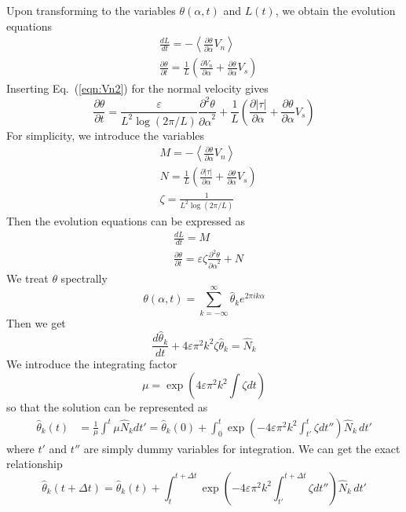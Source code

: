 \documentclass[11pt]{article}
\newcommand{\ppd}[2]  { \frac{\partial^2 #1}{{\partial #2}^2} }
\newcommand{\abs}[1]{\left| #1 \right|}
\newcommand{\mean}[1]{\left< #1 \right>}
\newcommand{\eps}{\varepsilon}
\newcommand{\atau}{\abs{\tau}}
\newcommand{\pderiv}[2]{\frac{\partial #1}{\partial #2}}
\newcommand{\tderiv}[2]{\frac{d #1}{d #2}}
\newcommand{\Vn}{V_n}
\newcommand{\Vs}{V_s}
\newcommand{\thalpha}{\pderiv{\theta}{\alpha}}
\newcommand{\elfun}{\zeta}
\newcommand{\thhat}{\hat{\theta}}
\begin{document}
Upon transforming to the variables $\theta(\alpha,t)$ and $L(t)$, we obtain the evolution equations
\begin{align}
& \tderiv{L}{t} = - \mean{\thalpha \Vn} \\
& \pderiv{\theta}{t} = \frac{1}{L} \left( \pderiv{\Vn}{\alpha} + \thalpha \Vs \right)
\end{align}
Inserting Eq.~(\ref{eqn:Vn2}) for the normal velocity gives
\begin{equation}
\pderiv{\theta}{t} = \frac{\eps}{L^{2} \log \left(2\pi/L \right)} \ppd{\theta}{\alpha} 
+ \frac{1}{L} \left( \pderiv{\atau}{\alpha} + \thalpha \Vs \right)
\end{equation}
For simplicity, we introduce the variables
\begin{align}
& M = - \mean{\thalpha \Vn} \\
& N = \frac{1}{L} \left( \pderiv{\atau}{\alpha} + \thalpha \Vs \right) \\
& \elfun = \frac{1}{L^{2} \log \left(2\pi/L \right)}
\end{align}
Then the evolution equations can be expressed as
\begin{align}
& \tderiv{L}{t} = M \\
& \pderiv{\theta}{t} = \eps \elfun \ppd{\theta}{\alpha} + N
\end{align}
We treat $\theta$ spectrally
\begin{equation}
\theta(\alpha,t) = \sum_{k = -\infty}^{\infty} \thhat_k e^{2\pi i k \alpha}
\end{equation}
Then we get
\begin{equation}
\tderiv{\thhat_k}{t} +  4 \eps \pi^2 k^2  \elfun \thhat_k = \hat{N}_k
\end{equation}
We introduce the integrating factor
\begin{equation}
\mu = \exp \left( 4 \eps \pi^2 k^2 \int \elfun dt \right)
\end{equation}
so that the solution can be represented as
\begin{align}
\thhat_k(t) & = \frac{1}{\mu} \int^t \mu \hat{N}_k dt'
= \thhat_k(0) + \int_0^t \exp \left( -4 \eps \pi^2 k^2 \int_{t'}^t \elfun dt'' \right) \hat{N}_k \, dt'
\end{align}
where $t'$ and $t''$ are simply dummy variables for integration. We can get the exact relationship
\begin{equation}
\thhat_k(t + \Delta t) = \thhat_k(t) 
+ \int_t^{t+\Delta t} \exp \left( -4 \eps \pi^2 k^2 \int_{t'}^{t+\Delta t} \elfun dt'' \right) \hat{N}_k \, dt'
\end{equation}
\end{document}
